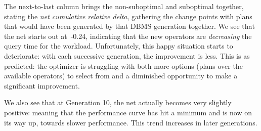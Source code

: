 \documentclass[prodmode,acmtods]{acmsmall}
\begin{document}
The next-to-last column brings the non-suboptimal and suboptimal together, stating
the {\em net cumulative relative delta}, gathering the change points
with plans that would have been generated by that DBMS generation
together. We see that the net starts out \hbox{at -0.24}, indicating that the new
operators are {\em decreasing} the query time for the
workload. Unfortunately, this happy situation starts to deteriorate: with
each successive generation, the improvement is less. This is as predicted:
the optimizer is struggling with both more options (plans over the available
operators) to select from and a diminished opportunity to make a significant
improvement.

We also see that at Generation 10, the net actually becomes very slightly positive: meaning that the performance
curve has hit a minimum and is now on its way up, towards slower
performance. This trend increases in later generations.


\begin{table}[t]
\end{table}
\end{document}
